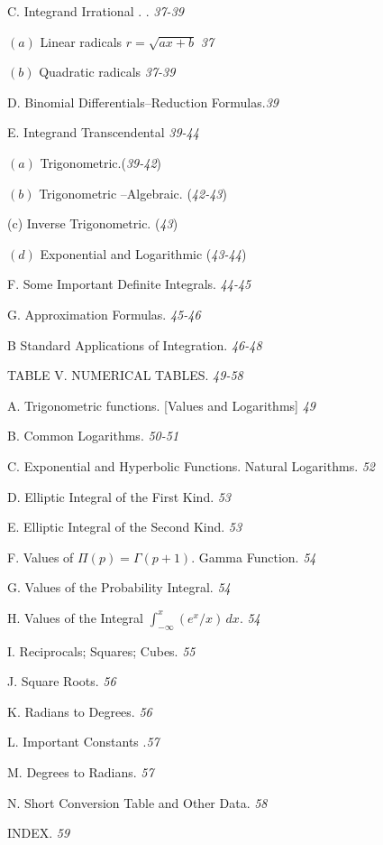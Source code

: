 \documentclass[12pt]{article}
\begin{document}
C. Integrand Irrational . . {\it 37-39}
\begin{center}
$(a)$ Linear radicals $r=\sqrt{ax+b}$ {\it 37}

$(b)$ Quadratic radicals {\it 37-39}
\end{center}

D. Binomial Differentials--Reduction Formulas.{\it 39}

E. Integrand Transcendental {\it 39-44}
\begin{center}
$(a)$ Trigonometric.({\it 39-42})

$( b)$ Trigonometric --Algebraic. {(\it 42-43})

(c) Inverse Trigonometric. ({\it 43})

$(d)$ Exponential and Logarithmic ({\it 43-44})
\end{center}

F. Some Important Definite Integrals. {\it 44-45}

G. Approximation Formulas. {\it 45-46}

B Standard Applications of Integration. {\it 46-48}


\begin{center}
TABLE V. NUMERICAL TABLES. {\it 49-58}
\end{center}

A. Trigonometric functions. [Values and Logarithms] {\it 49}

B. Common Logarithms. {\it 50-51}

C. Exponential and Hyperbolic Functions. Natural Logarithms. {\it 52}

D. Elliptic Integral of the First Kind. {\it 53}

E. Elliptic Integral of the Second Kind. {\it 53}

F. Values of $\Pi(p)=\Gamma(p+1)$. Gamma Function. {\it 54}

G. Values of the Probability Integral. {\it 54}

H. Values of the Integral $\displaystyle \int_{-\infty}^{x}(e^{x}/x)\, dx$. {\it 54}

I. Reciprocals; Squares; Cubes. {\it 55}

J. Square Roots. {\it 56}

K. Radians to Degrees. {\it 56}

L. Important Constants .{\it 57}

M. Degrees to Radians. {\it 57}

N. Short Conversion Table and Other Data. {\it 58}

INDEX. {\it 59}
\end{document}
